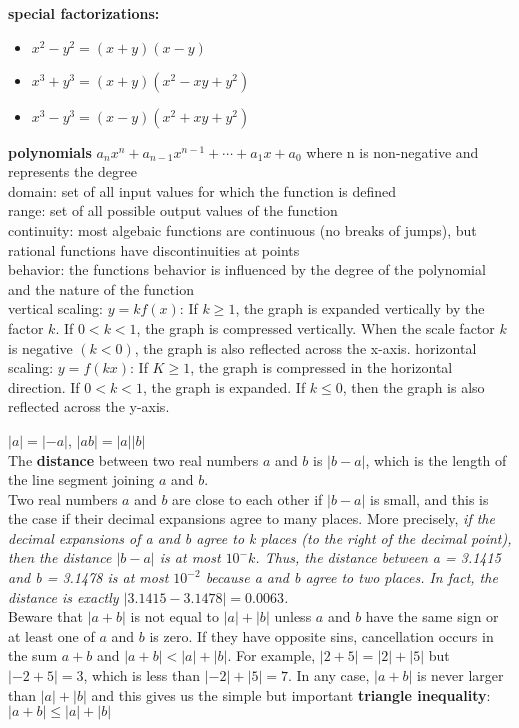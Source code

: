 \documentclass{article}
\begin{document}
\textbf{special factorizations:}
	\begin{itemize}
		\item $x^2 - y^2 = (x + y)(x - y)$
		\item $x^3 + y^3 = (x + y)(x^2 - xy + y^2)$
		\item $x^3 - y^3 = (x - y)(x^2 + xy + y^2)$
	\end{itemize}

\textbf{polynomials}
 $a_nx^n + a_{n-1}x^{n-1} + \cdots + a_1x + a_0$ where n is non-negative and represents the degree\\
domain: set of all input values for which the function is defined\\
range: set of all possible output values of the function\\
continuity: most algebaic functions are continuous (no breaks of jumps), but rational functions have discontinuities at points\\
behavior: the functions behavior is influenced by the degree of the polynomial and the nature of the function\\
vertical scaling: $y = kf(x)$: If $k \geq 1$, the graph is expanded vertically by the factor $k$. If $0 < k < 1$, the graph is compressed vertically. When the scale factor $k$ is negative $(k < 0)$, the graph is also reflected across the x-axis.
horizontal scaling: $y = f(kx)$: If $K \geq 1$, the graph is compressed in the horizontal direction. If $0 < k < 1$, the graph is expanded. If $k \leq 0$, then the graph is also reflected across the y-axis.

$\lvert a\rvert = \lvert -a\rvert$, $\lvert ab\rvert = \lvert a\rvert\lvert b\rvert$\\
The \textbf{distance} between two real numbers $a$ and $b$ is $\lvert b - a \rvert$, which is the length of the line segment joining $a$ and $b$.\\
Two real numbers $a$ and $b$ are close to each other if $\lvert b - a\rvert$ is small, and this is the case if their decimal expansions agree to many places. More precisely, \textit{if the decimal expansions of a and b agree to k places (to the right of the decimal point), then the distance $\lvert b - a\rvert$ is at most $10^-k$. Thus, the distance between a = 3.1415 and b = 3.1478 is at most $10^{-2}$ because a and b agree to two places. In fact, the distance is exactly $\lvert3.1415 - 3.1478\rvert = 0.0063$.}\\
Beware that $\lvert a + b\rvert$ is not equal to $\lvert a\rvert + \lvert b\rvert$ unless $a$ and $b$ have the same sign or at least one of $a$ and $b$ is zero. If they have opposite sins, cancellation occurs in the sum $a + b$ and $\lvert a+b\rvert < \lvert a\rvert + \lvert b\rvert$. For example, $\lvert 2 + 5\rvert = \lvert2\rvert + \lvert5\rvert$ but $\lvert-2 + 5\rvert = 3$, which is less than $\lvert-2\rvert + \lvert5\rvert = 7$. In any case, $\lvert a + b\rvert$ is never larger than $\lvert a\rvert + \lvert b\rvert$ and this gives us the simple but important \textbf{triangle inequality}: $\lvert a + b\rvert \leq \lvert a\rvert + \lvert b\rvert$\\
\end{document}
